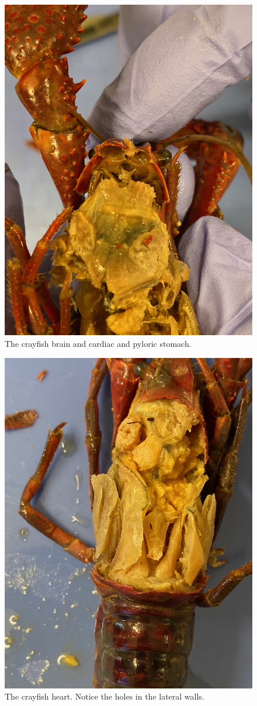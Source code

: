 \begin{figure}

{\centering \includegraphics[width=0.7\linewidth]{./figures/nematoda/crayfish_brain_and_stomach} 

}

\caption{The crayfish brain and cardiac and pyloric stomach.}\label{fig:brain}
\end{figure}

\begin{figure}

{\centering \includegraphics[width=0.7\linewidth]{./figures/nematoda/crayfish_heart} 

}

\caption{The crayfish heart. Notice the holes in the lateral walls.}\label{fig:heart}
\end{figure}

